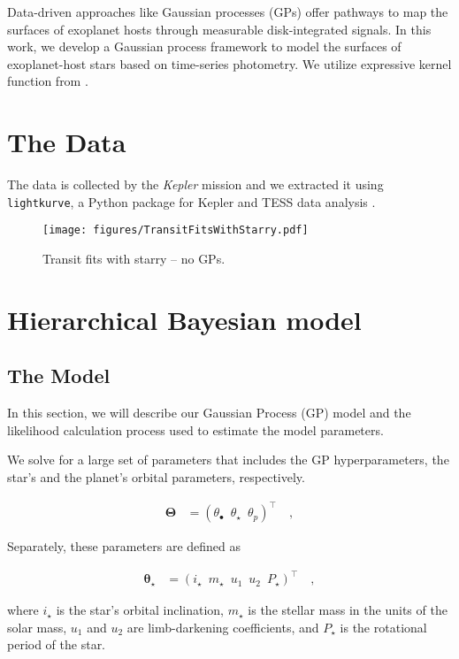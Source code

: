 \documentclass[twocolumn]{aastex631}
\begin{document}
Data-driven approaches like Gaussian processes (GPs) offer pathways to map the surfaces of exoplanet hosts through measurable disk-integrated signals. 
In this work, we develop a Gaussian process framework to model the surfaces of exoplanet-host stars based on time-series photometry. We utilize 
expressive kernel function from \cite{Luger2021b}. 




%
\section{The Data}
The data is collected by the \emph{Kepler} mission and we extracted it using
\texttt{lightkurve}, a Python package for Kepler and TESS data analysis \citep{lightkurve}.
%
\begin{figure}[ht!]
    \begin{centering}
        \texttt{[image: figures/TransitFitsWithStarry.pdf]}
        \caption{
            Transit fits with starry -- no GPs.
        }
        \label{fig:TransitFitsStarry}
    \end{centering}
\end{figure}
%
\section{Hierarchical Bayesian model}

%
\subsection{The Model}
In this section, we will describe our Gaussian Process (GP) model and the likelihood calculation process used to estimate the model parameters. 

We solve for a large set of parameters that includes the GP hyperparameters, the star's and the planet's orbital parameters, respectively. 
\begin{linenomath}\begin{align}
    \label{eq:largetheta}
    \pmb{\Theta}
     & =
    \left(
    \theta_\bullet
    \,\,\,
    \theta_\star
    \,\,\,
    \theta_p
    \right)^\top
    \quad,
\end{align}\end{linenomath}

Separately, these parameters are defined as 
\begin{linenomath}\begin{align}
    \label{eq:thetastar}
    \pmb{\theta_\star}
     & =
    \left(
    i_\star
    \,\,\,
    m_\star
    \,\,\,
    u_1
    \,\,\,
    u_2
    \,\,\,
    P_\star
    \right)^\top
    \quad,
\end{align}\end{linenomath}
where $i_\star$ is the star's orbital inclination, $m_\star$ is the stellar mass in the units of the solar mass, $u_1$ and $u_2$ are limb-darkening coefficients,
and $P_\star$ is the rotational period of the star.
\end{document}
